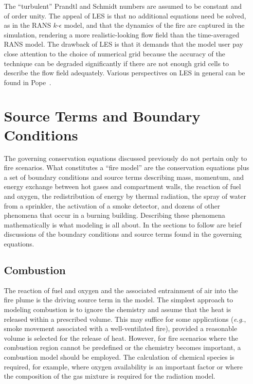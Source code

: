 \documentclass[graybox]{svmult}
\begin{document}
The ``turbulent'' Prandtl and Schmidt numbers are assumed to be constant and of order unity. The appeal of LES is that no additional equations need be solved, as in the RANS $k$-$\epsilon$  model, and that the dynamics of the fire are captured in the simulation, rendering a more realistic-looking flow field than the time-averaged RANS model. The drawback of LES is that it demands that the model user pay close attention to the choice of numerical grid because the accuracy of the technique can be degraded significantly if there are not enough grid cells to describe the flow field adequately. Various perspectives on LES in general can be found in Pope~\cite{Pope}.


\section{Source Terms and Boundary Conditions}

The governing conservation equations discussed previously do not pertain only to fire scenarios. What constitutes a ``fire model'' are the conservation equations plus a set of boundary conditions and source terms describing mass, momentum, and energy exchange between hot gases and compartment walls, the reaction of fuel and oxygen, the redistribution of energy by thermal radiation, the spray of water from a sprinkler, the activation of a smoke detector, and dozens of other phenomena that occur in a burning building. Describing these phenomena mathematically is what modeling is all about. In the sections to follow are brief discussions of the boundary conditions and source terms found in the governing equations.

\subsection{Combustion}

The reaction of fuel and oxygen and the associated entrainment of air into the fire plume is the driving source term in the model. The simplest approach to modeling combustion is to ignore the chemistry and assume that the heat is released within a prescribed volume. This may suffice for some applications ({\em e.g.}, smoke movement associated with a well-ventilated fire), provided a reasonable volume is selected for the release of heat. However, for fire scenarios where the combustion region cannot be predefined or the chemistry becomes important, a combustion model should be employed. The calculation of chemical species is required, for example, where oxygen availability is an important factor or where the composition of the gas mixture is required for the radiation model.
\end{document}
